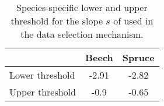 \newpage{}  %
\begin{singlespace}
  {\tabulinesep=2mm
    \begin{longtabu}{L S S}
      \caption{Species-specific lower and upper threshold for the slope \(s\) of  used in the data selection mechanism.  \label{tab:ReinekeSlopeThresholds}} \\
      \toprule
      & {Beech} & {Spruce} \\
      \midrule
      \endhead
      \bottomrule
      \endlastfoot
      Lower threshold & -2.91 & -2.82 \\
      Upper threshold & -0.9 & -0.65 \\
    \end{longtabu}
  }
\end{singlespace}

\clearpage{}


